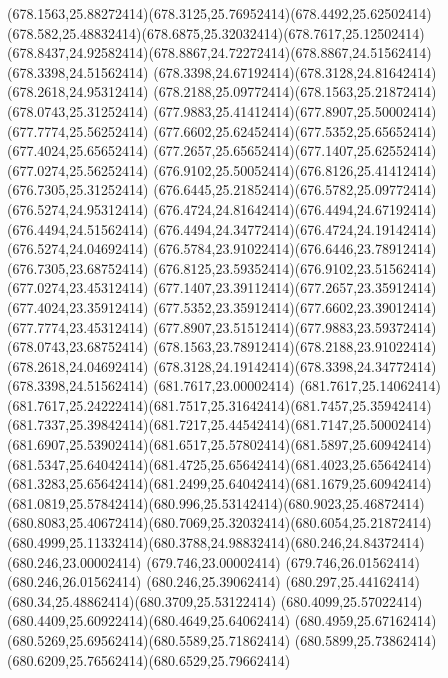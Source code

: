 {{	\curveto(678.1563,25.88272414)(678.3125,25.76952414)(678.4492,25.62502414)
	\curveto(678.582,25.48832414)(678.6875,25.32032414)(678.7617,25.12502414)
	\curveto(678.8437,24.92582414)(678.8867,24.72272414)(678.8867,24.51562414)
	\closepath
	\moveto(678.3398,24.51562414)
	\curveto(678.3398,24.67192414)(678.3128,24.81642414)(678.2618,24.95312414)
	\curveto(678.2188,25.09772414)(678.1563,25.21872414)(678.0743,25.31252414)
	\curveto(677.9883,25.41412414)(677.8907,25.50002414)(677.7774,25.56252414)
	\curveto(677.6602,25.62452414)(677.5352,25.65652414)(677.4024,25.65652414)
	\curveto(677.2657,25.65652414)(677.1407,25.62552414)(677.0274,25.56252414)
	\curveto(676.9102,25.50052414)(676.8126,25.41412414)(676.7305,25.31252414)
	\curveto(676.6445,25.21852414)(676.5782,25.09772414)(676.5274,24.95312414)
	\curveto(676.4724,24.81642414)(676.4494,24.67192414)(676.4494,24.51562414)
	\curveto(676.4494,24.34772414)(676.4724,24.19142414)(676.5274,24.04692414)
	\curveto(676.5784,23.91022414)(676.6446,23.78912414)(676.7305,23.68752414)
	\curveto(676.8125,23.59352414)(676.9102,23.51562414)(677.0274,23.45312414)
	\curveto(677.1407,23.39112414)(677.2657,23.35912414)(677.4024,23.35912414)
	\curveto(677.5352,23.35912414)(677.6602,23.39012414)(677.7774,23.45312414)
	\curveto(677.8907,23.51512414)(677.9883,23.59372414)(678.0743,23.68752414)
	\curveto(678.1563,23.78912414)(678.2188,23.91022414)(678.2618,24.04692414)
	\curveto(678.3128,24.19142414)(678.3398,24.34772414)(678.3398,24.51562414)
	\closepath
	\moveto(681.7617,23.00002414)
	\lineto(681.7617,25.14062414)
	\curveto(681.7617,25.24222414)(681.7517,25.31642414)(681.7457,25.35942414)
	\curveto(681.7337,25.39842414)(681.7217,25.44542414)(681.7147,25.50002414)
	\curveto(681.6907,25.53902414)(681.6517,25.57802414)(681.5897,25.60942414)
	\curveto(681.5347,25.64042414)(681.4725,25.65642414)(681.4023,25.65642414)
	\curveto(681.3283,25.65642414)(681.2499,25.64042414)(681.1679,25.60942414)
	\curveto(681.0819,25.57842414)(680.996,25.53142414)(680.9023,25.46872414)
	\curveto(680.8083,25.40672414)(680.7069,25.32032414)(680.6054,25.21872414)
	\curveto(680.4999,25.11332414)(680.3788,24.98832414)(680.246,24.84372414)
	\lineto(680.246,23.00002414)
	\lineto(679.746,23.00002414)
	\lineto(679.746,26.01562414)
	\lineto(680.246,26.01562414)
	\lineto(680.246,25.39062414)
	\curveto(680.297,25.44162414)(680.34,25.48862414)(680.3709,25.53122414)
	\curveto(680.4099,25.57022414)(680.4409,25.60922414)(680.4649,25.64062414)
	\curveto(680.4959,25.67162414)(680.5269,25.69562414)(680.5589,25.71862414)
	\curveto(680.5899,25.73862414)(680.6209,25.76562414)(680.6529,25.79662414)
}}
